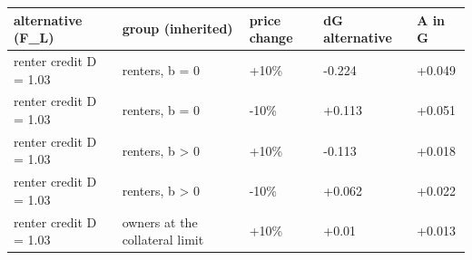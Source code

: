 \begingroup\small
\setlength{\tabcolsep}{3pt}
\renewcommand{\arraystretch}{1.04}
\begin{tabularx}{\linewidth}{XXXXX}
\toprule
alternative (F\_L) & group (inherited) & price change & dG alternative & A in G \\
\midrule
renter credit D = 1.03 & renters, b = 0 & +10\% & -0.224 & +0.049 \\
renter credit D = 1.03 & renters, b = 0 & -10\% & +0.113 & +0.051 \\
renter credit D = 1.03 & renters, b \textgreater{} 0 & +10\% & -0.113 & +0.018 \\
renter credit D = 1.03 & renters, b \textgreater{} 0 & -10\% & +0.062 & +0.022 \\
renter credit D = 1.03 & owners at the collateral limit & +10\% & +0.01 & +0.013 \\
\bottomrule
\end{tabularx}
\endgroup
